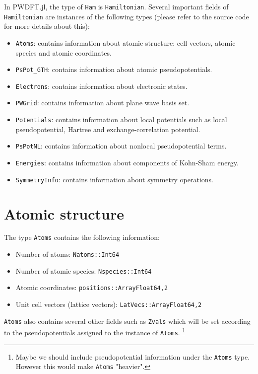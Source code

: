 \documentclass[a4paper,10pt]{article}
\newcommand{\jlinline}[1]{\texttt{#1}}
\begin{document}
In \textsf{PWDFT.jl}, the type of \jlinline{Ham} is \jlinline{Hamiltonian}.
Several important fields of \jlinline{Hamiltonian} are instances of the following
types (please refer to the source code for more details about this):
\begin{itemize}
\item \jlinline{Atoms}: contains information about atomic structure: cell
vectors, atomic species and atomic coordinates.
\item \jlinline{PsPot_GTH}: contains information about atomic pseudopotentials.
\item \jlinline{Electrons}: contains information about electronic states.
\item \jlinline{PWGrid}: contains information about plane wave basis set.
\item \jlinline{Potentials}: contains information about local potentials such
as local pseudopotential, Hartree and exchange-correlation potential.
\item \jlinline{PsPotNL}: contains information about nonlocal pseudopotential
terms.
\item \jlinline{Energies}: contains information about components of Kohn-Sham
energy.
\item \jlinline{SymmetryInfo}: contains information about symmetry operations.
\end{itemize}


\section{Atomic structure}
%
The type \jlinline{Atoms} contains the following information:
%
\begin{itemize}
\item Number of atoms: \jlinline{Natoms::Int64}
\item Number of atomic species: \jlinline{Nspecies::Int64}
\item Atomic coordinates: \jlinline{positions::Array{Float64,2}}
\item Unit cell vectors (lattice vectors): \jlinline{LatVecs::Array{Float64,2}}
\end{itemize}
%
\jlinline{Atoms} also contains several other fields such as \jlinline{Zvals}
which will be set according to the pseudopotentials assigned to
the instance of \jlinline{Atoms}.
\footnote{Maybe we should include pseudopotential information under the
\jlinline{Atoms} type. However this would make \jlinline{Atoms} "heavier".}
\end{document}
